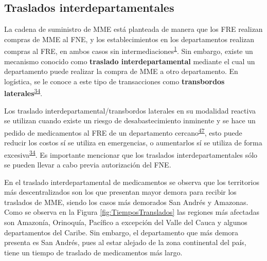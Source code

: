\documentclass[
]{book}
\begin{document}
\hypertarget{traslados-interdepartamentales}{%
\subsection{Traslados interdepartamentales}\label{traslados-interdepartamentales}}

La cadena de suministro de MME está planteada de manera que los FRE realizan compras de MME al FNE, y los establecimientos en los departamentos realizan compras al FRE, en ambos casos sin intermediaciones\textsuperscript{\protect\hyperlink{ref-MSPS1478-2006}{1}}. Sin embargo, existe un mecanismo conocido como \textbf{traslado interdepartamental} mediante el cual un departamento puede realizar la compra de MME a otro departamento. En logística, se le conoce a este tipo de transacciones como \textbf{transbordos laterales}\textsuperscript{\protect\hyperlink{ref-Silver2017}{34}}.

Los traslado interdepartamental/transbordos laterales en su modalidad reactiva se utilizan cuando existe un riesgo de desabastecimiento inminente y se hace un pedido de medicamentos al FRE de un departamento cercano\textsuperscript{\protect\hyperlink{ref-Paterson2011}{47}}, esto puede reducir los costos sí se utiliza en emergencias, o aumentarlos sí se utiliza de forma excesiva\textsuperscript{\protect\hyperlink{ref-Silver2017}{34}}. Es importante mencionar que los traslados interdepartamentales sólo se pueden llevar a cabo previa autorización del FNE.

En el traslado interdepartamental de medicamentos se observa que los territorios más descentralizados son los que presentan mayor demora para recibir los traslados de MME, siendo los casos más demorados San Andrés y Amazonas. Como se observa en la Figura \ref{fig:TiemposTranslados} las regiones más afectadas son Amazonía, Orinoquía, Pacífico a excepción del Valle del Cauca y algunos departamentos del Caribe. Sin embargo, el departamento que más demora presenta es San Andrés, pues al estar alejado de la zona continental del país, tiene un tiempo de traslado de medicamentos más largo.
\end{document}
